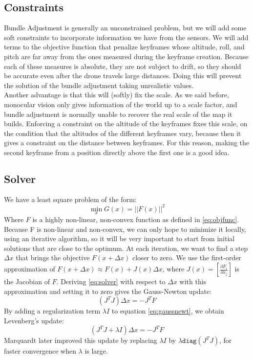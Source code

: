 \subsection{Constraints}
Bundle Adjustment is generally an unconstrained problem, but we will add some soft constraints to incorporate information we have from the sensors. We will add terms to the objective function that penalize keyframes whose altitude, roll, and pitch are far away from the ones measured during the keyframe creation. Because each of these measures is absolute, they are not subject to drift, so they should be accurate even after the drone travels large distances. Doing this will prevent the solution of the bundle adjustment taking unrealistic values. \\

Another advantage is that this will (softly) fix the scale. As we said before, monocular vision only gives information of the world up to a scale factor, and bundle adjustment is normally unable to recover the real scale of the map it builds. Enforcing a constraint on the altitude of the keyframes fixes this scale, on the condition that the altitudes of the different keyframes vary, because then it gives a constraint on the distance between keyframes. For this reason, making the second keyframe from a position directly above the first one is a good idea.


\subsection{Solver}
We have a least square problem of the form:
\begin{equation} \label{eq:solver}
  \min_{x} G(x) = ||F(x)||^2
\end{equation}
Where $F$ is a highly non-linear, non-convex function as defined in \ref{eq:objfunc}. Because F is non-linear and non-convex, we can only hope to minimize it locally, using an iterative algorithm, so it will be very important to start from initial solutions that are close to the optimum. At each iteration, we want to find a step $\Delta x$ that brings the objective $F(x+\Delta x)$ closer to zero. We use the first-order approximation of $F(x + \Delta x)\approx F(x) + J(x)\Delta x$, where $J(x) = \left[\frac{\partial F_i}{\partial x_j}\right]$ is the Jacobian of $F$. Deriving \ref{eq:solver} with respect to $\Delta x$ with this approximation and setting it to zero gives the Gauss-Newton update:
\begin{equation}\label{eq:gaussnewt}
	\left( J^TJ\right)\Delta x = -J^TF
\end{equation}
By adding a regularization term $\lambda I$ to equation \ref{eq:gaussnewt}, we obtain Levenberg's update:
\begin{equation}
	\left( J^TJ + \lambda I \right)\Delta x = -J^TF
\end{equation}
Marquardt later improved this update by replacing $\lambda I$ by $\lambda\texttt{diag}(J^TJ)$, for faster convergence when $\lambda$ is large.\\

